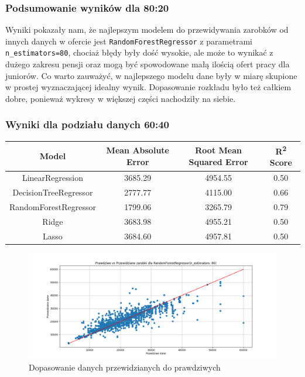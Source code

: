 \documentclass[a4paper]{article}
\begin{document}
\subsubsection{Podsumowanie wyników dla 80:20}

\quad Wyniki pokazały nam, że najlepszym modelem do przewidywania zarobków od innych danych w ofercie jest \texttt{RandomForestRegressor} z parametrami \texttt{n\_estimators=80},
chociaż błędy były dość wysokie, ale może to wynikać z dużego zakresu pensji oraz mogą być spowodowane małą ilością ofert pracy dla juniorów. Co warto zauważyć,
w najlepszego modelu dane były w miarę skupione w prostej wyznaczającej idealny wynik. Dopasowanie rozkładu było też całkiem dobre, ponieważ
wykresy w większej części nachodziły na siebie.


\subsubsection{Wyniki dla podziału danych 60:40}

\begin{table}[H]
    \centering
    \begin{tabular}{|c|c|c|c|}
        \hline
        \textbf{Model}        & \textbf{Mean Absolute Error} & \textbf{Root Mean Squared Error} & \textbf{R\textsuperscript{2} Score} \\ \hline
        LinearRegression      & 3685.29                      & 4954.55                          & 0.50                                \\ \hline
        DecisionTreeRegressor & 2777.77                      & 4115.00                          & 0.66                                \\ \hline
        RandomForestRegressor & 1799.06                      & 3265.79                          & 0.79                                \\ \hline
        Ridge                 & 3683.98                      & 4955.21                          & 0.50                                \\ \hline
        Lasso                 & 3684.60                      & 4957.81                          & 0.50                                \\ \hline
    \end{tabular}
\end{table}

\begin{figure}[H]
    \centering
    \includegraphics[width=\textwidth]{../analysis/plots/wyniki/0.6&0.4/RandomForestRegressor/scatter.png}
    \caption{Dopasowanie danych przewidzianych do prawdziwych}
\end{figure}
\end{document}
